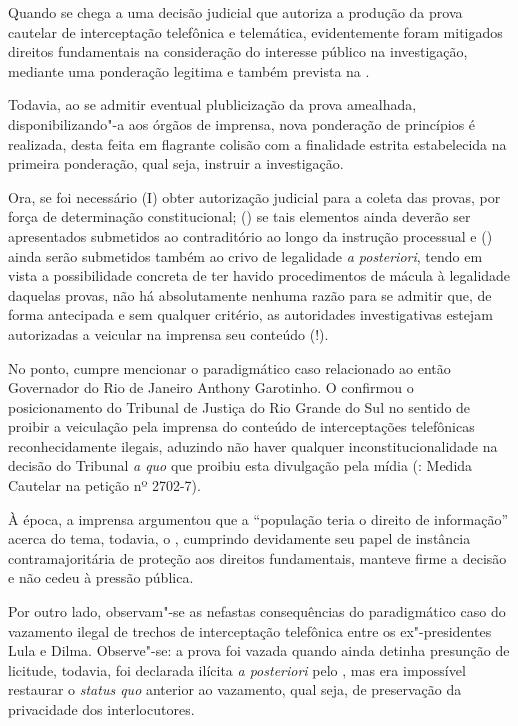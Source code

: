 Quando se chega a uma decisão judicial que autoriza a produção da prova
cautelar de interceptação telefônica e telemática, evidentemente foram
mitigados direitos fundamentais na consideração do interesse público na
investigação, mediante uma ponderação legitima e também prevista na .

Todavia, ao se admitir eventual plublicização da prova amealhada,
disponibilizando"-a aos órgãos de imprensa, nova ponderação de princípios
é realizada, desta feita em flagrante colisão com a finalidade estrita
estabelecida na primeira ponderação, qual seja, instruir a investigação.

Ora, se foi necessário (I) obter autorização judicial para a coleta das
provas, por força de determinação constitucional; () se tais elementos
ainda deverão ser apresentados submetidos ao contraditório ao longo da
instrução processual e () ainda serão submetidos também ao crivo de
legalidade \emph{a posteriori}, tendo em vista a possibilidade concreta
de ter havido procedimentos de mácula à legalidade daquelas provas, não
há absolutamente nenhuma razão para se admitir que, de forma antecipada
e sem qualquer critério, as autoridades investigativas estejam
autorizadas a veicular na imprensa seu conteúdo (!).

No ponto, cumpre mencionar o paradigmático caso relacionado ao então
Governador do Rio de Janeiro Anthony Garotinho. O  confirmou o
posicionamento do Tribunal de Justiça do Rio Grande do Sul no sentido de
proibir a veiculação pela imprensa do conteúdo de interceptações
telefônicas reconhecidamente ilegais, aduzindo não haver qualquer
inconstitucionalidade na decisão do Tribunal \emph{a quo} que proibiu
esta divulgação pela mídia (: Medida Cautelar na petição nº 2702-7).

À época, a imprensa argumentou que a ``população teria o direito de
informação'' acerca do tema, todavia, o , cumprindo devidamente seu
papel de instância contramajoritária de proteção aos direitos
fundamentais, manteve firme a decisão e não cedeu à pressão pública.

Por outro lado, observam"-se as nefastas consequências do paradigmático
caso do vazamento ilegal de trechos de interceptação telefônica entre os
ex"-presidentes Lula e Dilma. Observe"-se: a prova foi vazada quando ainda
detinha presunção de licitude, todavia, foi declarada ilícita \emph{a
posteriori} pelo , mas era impossível restaurar o \emph{status quo}
anterior ao vazamento, qual seja, de preservação da privacidade dos
interlocutores.

